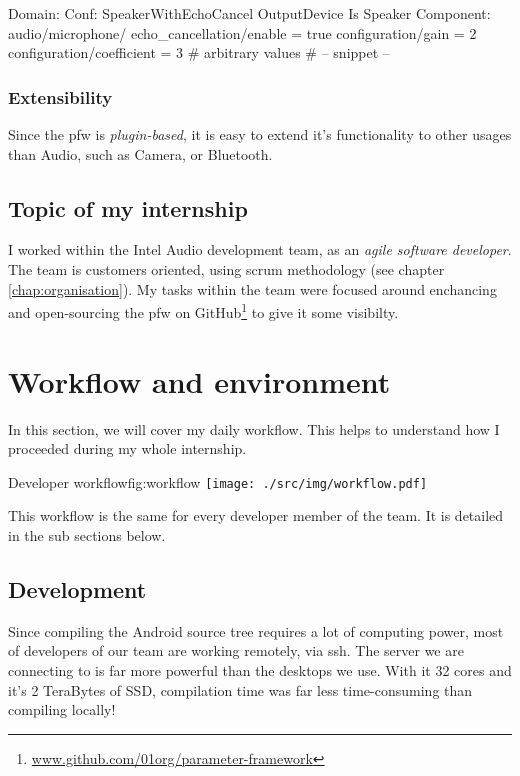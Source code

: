 \begin{code}[language=pfwLang, caption=Settings file example, label=lst:pfwsettings]
Domain:
    Conf: SpeakerWithEchoCancel
        OutputDevice Is Speaker
        Component: audio/microphone/
            echo_cancellation/enable = true
            configuration/gain = 2
            configuration/coefficient = 3 # arbitrary values
# -- snippet --
\end{code}

\subsubsection{Extensibility}
Since the \gls{pfw} is \emph{plugin-based}, it is easy to extend it's functionality to other usages than Audio, such
as Camera, or Bluetooth.


\subsection{Topic of my internship}
I worked within the Intel Audio development team, as an \emph{agile
software developer}. The team is customers oriented, using \gls{scrum}
methodology (see chapter \ref{chap:organisation}). My tasks
within the team were focused around enchancing and open-sourcing the \gls{pfw} on
\gls{GitHub}\footnote{\url{www.github.com/01org/parameter-framework}} to give it some
visibilty.


\section{Workflow and environment}
In this section, we will cover my daily workflow. This helps
to understand how I proceeded during my whole internship.

\begin{figureGraphics}{Developer workflow}{fig:workflow}
    \texttt{[image: ./src/img/workflow.pdf]}
\end{figureGraphics}

This workflow is the same for every developer member of the team. It is
detailed in the sub sections below.

\subsection{Development}
Since compiling the Android source tree requires a lot of computing power,
most of developers of our team are working remotely, via ssh.
The server we are connecting to is far more powerful than the desktops we use.
With it 32 cores and it's 2 TeraBytes of SSD, compilation time was far less time-consuming
than compiling locally!

